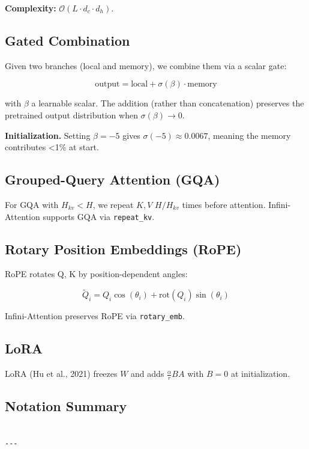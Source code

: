 \textbf{Complexity:} $\mathcal{O}(L \cdot d_c \cdot d_h)$.

\subsection{Gated Combination}

Given two branches (local and memory), we combine them via a scalar gate:

\[
\text{output} = \text{local} + \sigma(\beta) \cdot \text{memory}
\tag{3.5}
\]

with $\beta$ a learnable scalar. The addition (rather than concatenation) 
preserves the pretrained output distribution when $\sigma(\beta) \to 0$.

\textbf{Initialization.} Setting $\beta = -5$ gives $\sigma(-5) \approx 0.0067$, 
meaning the memory contributes <1\% at start.

\subsection{Grouped-Query Attention (GQA)}

For GQA with $H_{kv} < H$, we repeat $K, V$ $H / H_{kv}$ times before 
attention. Infini-Attention supports GQA via \texttt{repeat\_kv}.

\subsection{Rotary Position Embeddings (RoPE)}

RoPE rotates Q, K by position-dependent angles:

\[
\tilde{Q}_i = Q_i \cos(\theta_i) + \text{rot}(Q_i) \sin(\theta_i)
\tag{3.6}
\]

Infini-Attention preserves RoPE via \texttt{rotary\_emb}.

\subsection{LoRA}

LoRA (Hu et al., 2021) freezes $W$ and adds $\frac{\alpha}{r} B A$ with 
$B = 0$ at initialization.

\subsection{Notation Summary}

\begin{lstlisting}

---
\end{lstlisting}